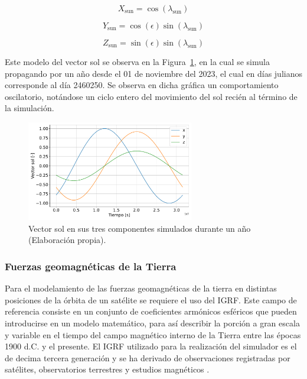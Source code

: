 \begin{equation}
	X_{\text{sun}} = \cos(\lambda_{\text{sun}})
	\label{eq:x_sun}
\end{equation}

\begin{equation}
	Y_{\text{sun}} = \cos(\epsilon) \sin(\lambda_{\text{sun}})
	\label{eq:y_sun}
\end{equation}

\begin{equation}
	Z_{\text{sun}} = \sin(\epsilon) \sin(\lambda_{\text{sun}})
	\label{eq:z_sun}
\end{equation}

Este modelo del vector sol se observa en la Figura~\ref{fig:ss}, en la cual se simula propagando por un año desde el 01 de noviembre del 2023, el cual en días julianos corresponde al día 2460250. Se observa en dicha gráfica un comportamiento oscilatorio, notándose un ciclo entero del movimiento del sol recién al término de la simulación.

\begin{figure}[h]
	\centering    
	\includegraphics[width=0.65\textwidth]{ss.pdf}
	\caption{Vector sol en sus tres componentes simulados durante un año (Elaboración propia).}
	\label{fig:ss}
\end{figure}


\subsubsection{Fuerzas geomagnéticas de la Tierra}

Para el modelamiento de las fuerzas geomagnéticas de la tierra en distintas posiciones de la órbita de un satélite se requiere el uso del \gls{IGRF}. Este campo de referencia consiste en un conjunto de coeficientes armónicos esféricos que pueden introducirse en un modelo matemático, para así describir la porción a gran escala y variable en el tiempo del campo magnético interno de la Tierra entre las épocas 1900 d.C. y el presente. El IGRF utilizado para la realización del simulador es el de decima tercera generación y se ha derivado de observaciones registradas por satélites, observatorios terrestres y estudios magnéticos \cite{ref39}.

